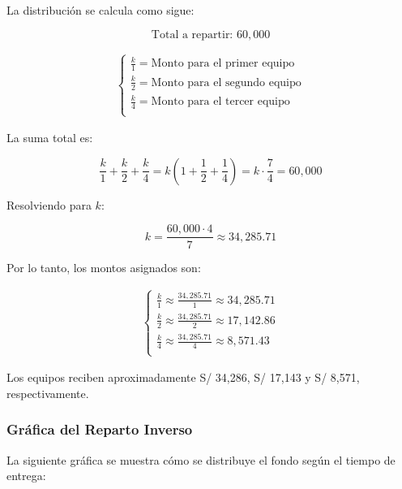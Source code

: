 \documentclass[
  stu,
  floatsintext,
  longtable,
  a4paper,
  nolmodern,
  notxfonts,
  notimes,
  12pt,
  colorlinks=true,linkcolor=blue,citecolor=blue,urlcolor=blue]{apa7}
\begin{document}
La distribución se calcula como sigue:

\[
\text{Total a repartir: } 60,000
\]

\begin{align*}
\begin{cases}
\frac{k}{1} = \text{Monto para el primer equipo} \\
\frac{k}{2} = \text{Monto para el segundo equipo} \\
\frac{k}{4} = \text{Monto para el tercer equipo} \\
\end{cases}
\end{align*}

La suma total es:

\[
\frac{k}{1} + \frac{k}{2} + \frac{k}{4} = k \left(1 + \frac{1}{2} + \frac{1}{4}\right) = k \cdot \frac{7}{4} = 60,000
\]

Resolviendo para \(k\):

\[
k = \frac{60,000 \cdot 4}{7} \approx 34,285.71
\]

Por lo tanto, los montos asignados son:

\begin{align*}
\begin{cases}
\frac{k}{1} \approx \frac{34,285.71}{1} \approx 34,285.71 \\
\frac{k}{2} \approx \frac{34,285.71}{2} \approx 17,142.86 \\
\frac{k}{4} \approx \frac{34,285.71}{4} \approx 8,571.43 \\
\end{cases}
\end{align*}

Los equipos reciben aproximadamente S/ 34,286, S/ 17,143 y S/ 8,571,
respectivamente.

\subsubsection{Gráfica del Reparto
Inverso}\label{gruxe1fica-del-reparto-inverso}

La siguiente gráfica se muestra cómo se distribuye el fondo según el
tiempo de entrega:
\end{document}
